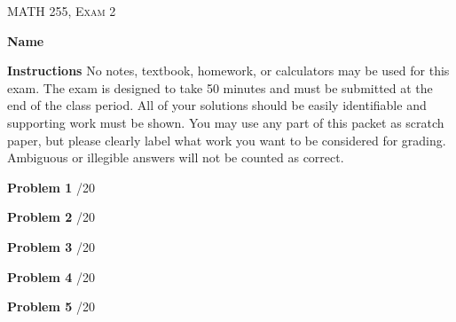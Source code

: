 \documentclass[12pt]{amsbook}
\begin{document}

\SetWatermarkText{
\begin{minipage}[c][8cm]{8cm}
\begin{center}
 
\end{center}
\end{minipage}
}



\begin{center}
   \textsc{\large MATH 255, Exam 2}\\
\end{center}
\vspace{1cm}

\textbf{Name} \; \underline{\hspace{5cm}}

\vspace{1cm}

\textbf{Instructions} \; No notes, textbook, homework, or calculators may be used for this exam. The exam is designed to take 50 minutes and must be submitted at the end of the class period. All of your solutions should be easily identifiable and supporting work must be shown. You may use any part of this packet as scratch paper, but please clearly label what work you want to be considered for grading. Ambiguous or illegible answers will not be counted as correct.

\vspace{1cm}

\textbf{Problem 1} \; \underline{\hspace{.75cm}}/20

\vspace{.25cm}

\textbf{Problem 2} \; \underline{\hspace{.75cm}}/20

\vspace{.25cm}

\textbf{Problem 3} \; \underline{\hspace{.75cm}}/20

\vspace{.25cm}

\textbf{Problem 4} \; \underline{\hspace{.75cm}}/20

\vspace{.25cm}

\textbf{Problem 5} \; \underline{\hspace{.75cm}}/20
\end{document}
